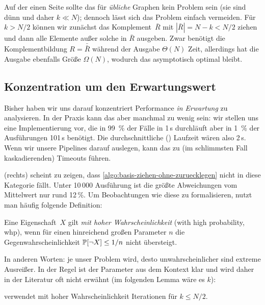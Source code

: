 Auf  der einen Seite sollte das für \emph{übliche} Graphen kein Problem sein (sie sind dünn und daher $k \ll N$); dennoch lässt sich das Problem einfach vermeiden.
Für $k > N / 2$ können wir zunächst das Komplement~$\bar R$ mit  $| \bar R | = N - k < N/2$ ziehen und dann alle Elemente außer solche in $\bar R$ ausgeben.
Zwar benötigt die Komplementbildung $R = \bar{\bar R}$ während der Ausgabe $\Theta(N)$ Zeit, allerdings hat die Ausgabe ebenfalls Größe $\Omega(N)$, wodurch das asymptotisch optimal bleibt.

\subsection{Konzentration um den Erwartungswert}
Bisher haben wir uns darauf konzentriert Performance \emph{in Erwartung} zu analysieren.
In der Praxis kann das aber manchmal zu wenig sein:
wir stellen uns eine Implementierung vor, die in 99~\% der Fälle in 1\,s durchläuft aber in 1~\% der Ausführungen 101\,s benötigt.
Die durchschnittliche () Laufzeit wären also 2\,s.
Wenn wir unsere Pipelines darauf auslegen, kann das zu (im schlimmsten Fall kaskadierenden) Timeouts führen.

 (rechts) scheint zu zeigen, dass \cref{algo:basis-ziehen-ohne-zuruecklegen} nicht in diese Kategorie fällt.
Unter 10\,000 Ausführung ist die größte Abweichungen vom Mittelwert nur rund 12\,\%.
Um Beobachtungen wie diese zu formalisieren, nutzt man häufig folgende Definition:

\begin{definition}
    Eine  Eigenschaft~$X$ gilt \emph{mit hoher Wahrscheinlichkeit} (with high probability, whp),
    wenn für einen hinreichend großen Parameter $n$ die Gegenwahrscheinlichkeit $\mathbb{P}\!\left[\lnot X\right] \le 1/n$ nicht übersteigt.
\end{definition}

In anderen Worten: je  unser Problem wird, desto unwahrscheinlicher sind extreme Ausreißer.
In der Regel ist der Parameter aus dem Kontext klar und wird daher in der Literatur oft nicht erwähnt (im folgenden Lemma wäre es $k$):

\begin{lemma}
     verwendet mit hoher Wahrscheinlichkeit  Iterationen für $k \le N/2$.
\end{lemma}

